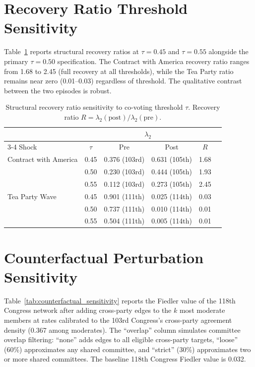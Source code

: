 \documentclass[12pt, a4paper]{article}
\begin{document}
\section{Recovery Ratio Threshold Sensitivity}
\label{app:recovery}

Table~\ref{tab:recovery_sensitivity} reports structural recovery ratios at $\tau = 0.45$ and $\tau = 0.55$ alongside the primary $\tau = 0.50$ specification. The Contract with America recovery ratio ranges from 1.68 to 2.45 (full recovery at all thresholds), while the Tea Party ratio remains near zero (0.01--0.03) regardless of threshold. The qualitative contrast between the two episodes is robust.

\begin{table}[H]
\centering
\caption{Structural recovery ratio sensitivity to co-voting threshold $\tau$. Recovery ratio $R = \lambda_2(\text{post}) / \lambda_2(\text{pre})$.}
\label{tab:recovery_sensitivity}
\small
\begin{tabular}{lccccc}
\toprule
 & & \multicolumn{2}{c}{$\lambda_2$} & \\
\cmidrule(lr){3-4}
Shock & $\tau$ & Pre & Post & $R$ \\
\midrule
Contract with America & 0.45 & 0.376 (103rd) & 0.631 (105th) & 1.68 \\
 & 0.50 & 0.230 (103rd) & 0.444 (105th) & 1.93 \\
 & 0.55 & 0.112 (103rd) & 0.273 (105th) & 2.45 \\
\midrule
Tea Party Wave & 0.45 & 0.901 (111th) & 0.025 (114th) & 0.03 \\
 & 0.50 & 0.737 (111th) & 0.010 (114th) & 0.01 \\
 & 0.55 & 0.504 (111th) & 0.005 (114th) & 0.01 \\
\bottomrule
\end{tabular}
\end{table}

\section{Counterfactual Perturbation Sensitivity}
\label{app:counterfactual}

Table~\ref{tab:counterfactual_sensitivity} reports the Fiedler value of the 118th Congress network after adding cross-party edges to the $k$ most moderate members at rates calibrated to the 103rd Congress's cross-party agreement density (0.367 among moderates). The ``overlap'' column simulates committee overlap filtering: ``none'' adds edges to all eligible cross-party targets, ``loose'' (60\%) approximates any shared committee, and ``strict'' (30\%) approximates two or more shared committees. The baseline 118th Congress Fiedler value is 0.032.
\end{document}
